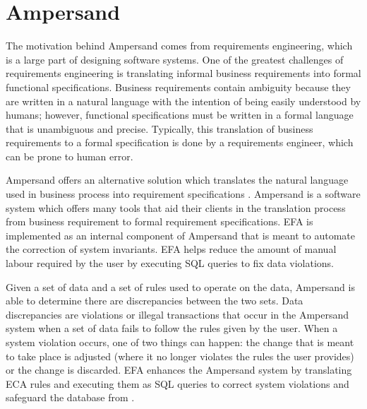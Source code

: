 \documentclass[journal,12pt,onecolumn,draftclsnofoot]{report}
\begin{document}
\section{Ampersand}


\indent
The motivation behind Ampersand comes from requirements engineering, which is a 
large part of designing software systems. One of the greatest challenges of 
requirements engineering is translating informal business requirements into 
formal functional specifications. Business requirements contain ambiguity 
because they are written in a natural language with the intention of being 
easily understood by humans; however,
functional specifications must be written in a formal language that is 
unambiguous and precise. Typically, this translation of business requirements 
to a formal specification is done by a requirements
engineer, which can be prone to human error.

Ampersand offers an alternative solution which translates the natural language 
used in business process into requirement specifications
\cite{ruledesign}. 
Ampersand is a 
software system which offers many tools that aid their clients in the 
translation process from business requirement to formal requirement 
specifications. EFA is implemented as an internal component of Ampersand that 
is meant to automate the correction of system invariants. EFA helps reduce the 
amount of manual labour required by the user by executing SQL queries to fix 
data violations. %

Given a set of data and a set of rules used to operate on the data, Ampersand 
is able to determine  there are discrepancies between the two sets.
Data discrepancies are violations or illegal transactions
that occur in the Ampersand system
when a set of data fails to follow the rules given by the user.
When a system violation occurs,
one of two things can happen: the change that is meant to 
take place is adjusted (where it no longer violates the rules the user 
provides) or the change is discarded. EFA enhances the Ampersand system by 
translating ECA rules and executing them as SQL queries to correct system 
violations and safeguard the database from .
\end{document}
